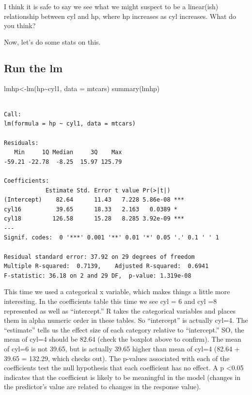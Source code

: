 \documentclass[
  letterpaper,
  DIV=11,
  numbers=noendperiod]{scrartcl}
\newenvironment{Shaded}{\begin{snugshade}}{\end{snugshade}}
\newcommand{\AttributeTok}[1]{\textcolor[rgb]{0.40,0.45,0.13}{#1}}
\newcommand{\FunctionTok}[1]{\textcolor[rgb]{0.28,0.35,0.67}{#1}}
\newcommand{\NormalTok}[1]{\textcolor[rgb]{0.00,0.23,0.31}{#1}}
\newcommand{\OtherTok}[1]{\textcolor[rgb]{0.00,0.23,0.31}{#1}}
\newcommand{\SpecialCharTok}[1]{\textcolor[rgb]{0.37,0.37,0.37}{#1}}
\begin{document}
\hfill\break
I think it is safe to say we see what we might suspect to be a
linear(ish) relationship between cyl and hp, where hp increases as cyl
increases. What do you think?

Now, let's do some stats on this.

\subsection{\texorpdfstring{\textbf{Run the lm}}{Run the lm}}

\begin{Shaded}
\begin{Highlighting}[]
\NormalTok{lmhp}\OtherTok{\textless{}{-}}\FunctionTok{lm}\NormalTok{(hp}\SpecialCharTok{\textasciitilde{}}\NormalTok{cyl1, }\AttributeTok{data =}\NormalTok{ mtcars)}
\FunctionTok{summary}\NormalTok{(lmhp)}
\end{Highlighting}
\end{Shaded}

\begin{verbatim}

Call:
lm(formula = hp ~ cyl1, data = mtcars)

Residuals:
   Min     1Q Median     3Q    Max 
-59.21 -22.78  -8.25  15.97 125.79 

Coefficients:
            Estimate Std. Error t value Pr(>|t|)    
(Intercept)    82.64      11.43   7.228 5.86e-08 ***
cyl16          39.65      18.33   2.163   0.0389 *  
cyl18         126.58      15.28   8.285 3.92e-09 ***
---
Signif. codes:  0 '***' 0.001 '**' 0.01 '*' 0.05 '.' 0.1 ' ' 1

Residual standard error: 37.92 on 29 degrees of freedom
Multiple R-squared:  0.7139,    Adjusted R-squared:  0.6941 
F-statistic: 36.18 on 2 and 29 DF,  p-value: 1.319e-08
\end{verbatim}

This time we used a categorical x variable, which makes things a little
more interesting. In the coefficients table this time we see cyl = 6 and
cyl =8 represented as well as ``intercept.'' R takes the categorical
variables and places them in alpha numeric order in these tables. So
``intercept'' is actually cyl=4. The ``estimate'' tells us the effect
size of each category relative to ``intercept.'' SO, the mean of cyl=4
should be 82.64 (check the boxplot above to confirm). The mean of cyl=6
is not 39.65, but is actually 39.65 higher than mean of cyl=4 (82.64 +
39.65 = 132.29, which checks out). The p-values associated with each of
the coefficients test the null hypothesis that each coefficient has no
effect. A p \textless0.05 indicates that the coefficient is likely to be
meaningful in the model (changes in the predictor's value are related to
changes in the response value).
\end{document}
